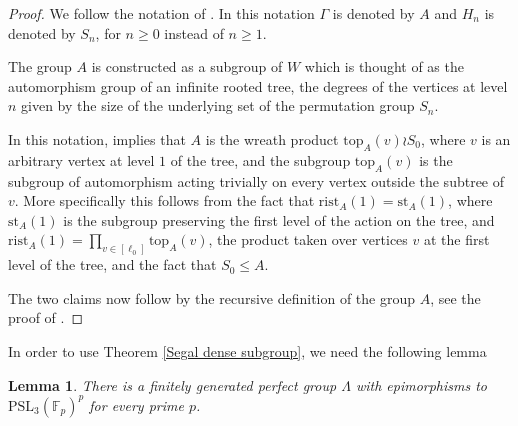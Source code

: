 \documentclass[letterpaper]{amsart}
\newtheorem{lemma}[theorem]{Lemma}
\begin{document}
\begin{proof}
    We follow the notation of \cite{segal2000finite}. In this notation $\Gamma$ is denoted by $A$ and $H_n$ is denoted by $S_n$, for $n \geq 0$ instead of $n \geq 1$.

    The group $A$ is constructed as a subgroup of $W$ which is thought of as the automorphism group of an infinite rooted tree, the degrees of the vertices at level $n$ given by the size of the underlying set of the permutation group $S_n$.

    In this notation, \cite[Lemma 1]{segal2000finite} implies that $A$ is the wreath product $\mathrm{top}_A(v) \wr S_0$, where $v$ is an arbitrary vertex at level $1$ of the tree, and the subgroup $\mathrm{top}_A(v)$ is the subgroup of automorphism acting trivially on every vertex outside the subtree of $v$. More specifically this follows from the fact that $\mathrm{rist}_A(1) = \mathrm{st}_A(1)$, where $\mathrm{st}_A(1)$ is the subgroup preserving the first level of the action on the tree, and $\mathrm{rist}_A(1) = \prod_{v \in [\ell_0]} \mathrm{top}_A(v)$, the product taken over vertices $v$ at the first level of the tree, and the fact that $S_0 \leq A$.

    The two claims now follow by the recursive definition of the group $A$, see the proof of \cite[Theorem 5]{segal2000finite}.
\end{proof}
In order to use Theorem \ref{Segal dense subgroup}, we need the following lemma
\begin{lemma}
\label{Suslin group}
    There is a finitely generated perfect group $\Lambda$ with epimorphisms to $\mathrm{PSL}_3(\mathbb{F}_p)^p$ for every prime $p$.
\end{lemma}
\end{document}
